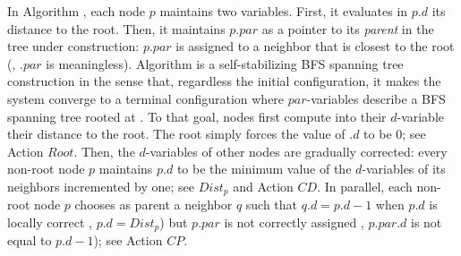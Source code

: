 In Algorithm \BFS, each node $p$ maintains two variables. First, it
evaluates in $p.d$ its distance to the root. Then, it maintains
 $p.par$ as a pointer to its \emph{parent} in the tree under
construction: $p.par$ is assigned to a neighbor that is closest to the
root (\nb, \Root.$par$ is meaningless).
Algorithm \BFS is a self-stabilizing BFS spanning tree construction in
the sense that, regardless the initial configuration, it makes the
system converge to a terminal configuration where $par$-variables
describe a BFS spanning tree rooted at \Root.
To that goal, nodes first compute into their $d$-variable their distance
to the root. The root simply forces the value of \Root.$d$ to be 0;
see  Action $Root$. Then, the $d$-variables of other nodes
are gradually corrected: every non-root node $p$ maintains $p.d$ to
be the minimum value of the $d$-variables of its neighbors incremented
by one; see $Dist_{p}$ and Action $CD$.
In parallel, each non-root node $p$ chooses as parent a neighbor $q$
such that $q.d = p.d-1$ when $p.d$ is locally correct \ie, $p.d =
Dist_{p}$) but $p.par$ is not correctly assigned \ie, $p.par.d$ is not
equal to $p.d-1$); see Action $CP$.


